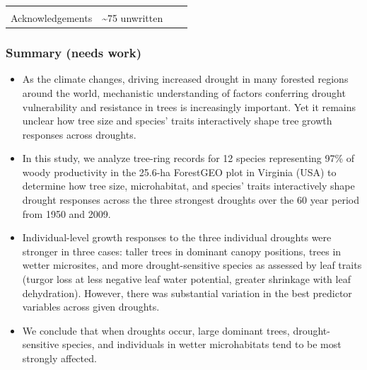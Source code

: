\documentclass[]{article}
\begin{document}
\begin{longtable}[]{@{}llll@{}}
\begin{minipage}[t]{0.22\columnwidth}
\strut
\end{minipage} & \begin{minipage}[t]{0.15\columnwidth}\raggedright
\strut
\end{minipage}\tabularnewline
\begin{minipage}[t]{0.35\columnwidth}\raggedright
Acknowledgements\strut
\end{minipage} & \begin{minipage}[t]{0.16\columnwidth}\raggedright
\textasciitilde{}75 unwritten\strut
\end{minipage} & \begin{minipage}[t]{0.22\columnwidth}\raggedright
\strut
\end{minipage} & \begin{minipage}[t]{0.15\columnwidth}\raggedright
\strut
\end{minipage}\tabularnewline
\bottomrule
\end{longtable}

\newpage

\hypertarget{summary-needs-work}{%
\subsubsection{\texorpdfstring{Summary (\textbf{needs
work})}{Summary (needs work)}}\label{summary-needs-work}}

\begin{itemize}
\item
  As the climate changes, driving increased drought in many forested
  regions around the world, mechanistic understanding of factors
  conferring drought vulnerability and resistance in trees is
  increasingly important. Yet it remains unclear how tree size and
  species' traits interactively shape tree growth responses across
  droughts.
\item
  In this study, we analyze tree-ring records for 12 species
  representing 97\% of woody productivity in the 25.6-ha ForestGEO plot
  in Virginia (USA) to determine how tree size, microhabitat, and
  species' traits interactively shape drought responses across the three
  strongest droughts over the 60 year period from 1950 and 2009.
\item
  Individual-level growth responses to the three individual droughts
  were stronger in three cases: taller trees in dominant canopy
  positions, trees in wetter microsites, and more drought-sensitive
  species as assessed by leaf traits (turgor loss at less negative leaf
  water potential, greater shrinkage with leaf dehydration). However,
  there was substantial variation in the best predictor variables across
  given droughts.
\item
  We conclude that when droughts occur, large dominant trees,
  drought-sensitive species, and individuals in wetter microhabitats
  tend to be most strongly affected.
\end{itemize}
\end{document}
